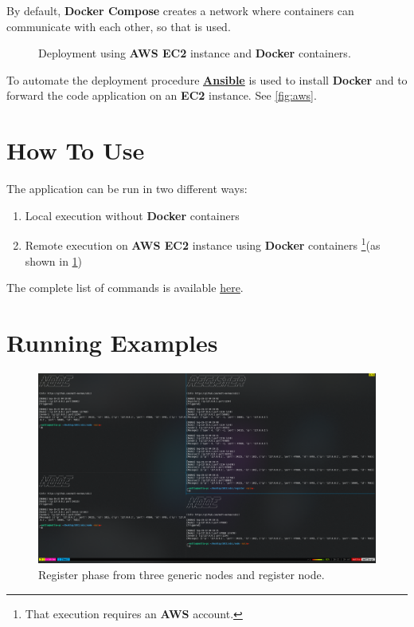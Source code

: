 \documentclass[conference]{IEEEtran}
\begin{document}
By default, \textbf{Docker Compose} creates a network where containers can communicate with each other, so that is used. 

\begin{figure}[htbp]\label{fig:arch}
  \centering
  
  \caption{Deployment using \textbf{AWS EC2} instance and \textbf{Docker} containers.}
\end{figure}

To automate the deployment procedure \href{https://www.ansible.com/}{\textbf{Ansible}} is used to install \textbf{Docker} and to forward the code application on an \textbf{EC2} instance. See \ref{fig:aws}.

\section{How To Use}\label{how}

The application can be run in two different ways:

\begin{enumerate}
    \item Local execution without \textbf{Docker} containers
    \item Remote execution on \textbf{AWS EC2} instance using \textbf{Docker} containers \footnote{That execution requires an \textbf{AWS} account.}(as shown in \ref{fig:arch})
\end{enumerate}

The complete list of commands is available \href{https://github.com/matt-merman/SDCC#running}{here}.

\section{Running Examples}

\begin{figure}[htb]\label{fig:register}
\includegraphics[width=\linewidth]{figure/register_terminal.png}
\caption{Register phase from three generic nodes and register node.}
\end{figure}
\end{document}
